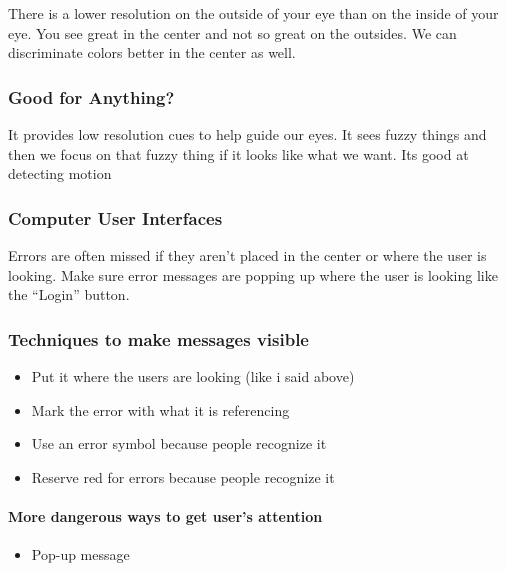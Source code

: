 \documentclass[11pt,]{article}
\providecommand{\tightlist}{%
  \setlength{\itemsep}{0pt}\setlength{\parskip}{0pt}}
\let\oldparagraph\paragraph
\renewcommand{\paragraph}[1]{\oldparagraph{#1}\mbox{}}
\begin{document}
There is a lower resolution on the outside of your eye than on the
inside of your eye. You see great in the center and not so great on the
outsides. We can discriminate colors better in the center as well.

\hypertarget{good-for-anything}{%
\subsubsection{Good for Anything?}\label{good-for-anything}}

It provides low resolution cues to help guide our eyes. It sees fuzzy
things and then we focus on that fuzzy thing if it looks like what we
want. Its good at detecting motion

\hypertarget{computer-user-interfaces}{%
\subsubsection{Computer User
Interfaces}\label{computer-user-interfaces}}

Errors are often missed if they aren't placed in the center or where the
user is looking. Make sure error messages are popping up where the user
is looking like the ``Login'' button.

\hypertarget{techniques-to-make-messages-visible}{%
\subsubsection{Techniques to make messages
visible}\label{techniques-to-make-messages-visible}}

\begin{itemize}
\tightlist
\item
  Put it where the users are looking (like i said above)
\item
  Mark the error with what it is referencing
\item
  Use an error symbol because people recognize it
\item
  Reserve red for errors because people recognize it
\end{itemize}

\hypertarget{more-dangerous-ways-to-get-users-attention}{%
\paragraph{More dangerous ways to get user's
attention}\label{more-dangerous-ways-to-get-users-attention}}

\begin{itemize}
\tightlist
\item
  Pop-up message
\end{itemize}
\end{document}
